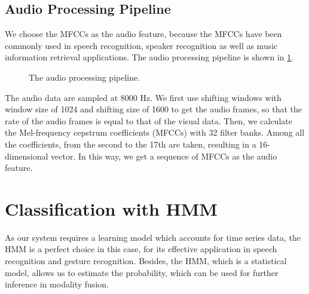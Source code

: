 \documentclass[12pt,final,twoside]{report}
\theoremstyle{plain}
\theoremstyle{definition}
\theoremstyle{remark}
\newcommand{\includetexfig}[1]{}
\begin{document}
\subsection{Audio Processing Pipeline}
We choose the MFCCs as the audio feature, because the MFCCs have been commonly used in speech recognition, speaker recognition as well as music information retrieval applications. The audio processing pipeline is shown in \cref{fig:apipe}.

\begin{figure}[t]
  \centering
  \includetexfig{apipe}
  \caption{The audio processing pipeline.}
  \label{fig:apipe}
\end{figure}

The audio data are sampled at 8000 Hz. We first use shifting windows with window size of 1024 and shifting size of 1600 to get the audio frames, so that the rate of the audio frames is equal to that of the visual data. Then, we calculate the Mel-frequency cepstrum coefficients (MFCCs) with 32 filter banks. Among all the coefficients, from the second to the 17th are taken, resulting in a 16-dimensional vector. In this way, we get a sequence of MFCCs as the audio feature.

\section{Classification with HMM}
As our system requires a learning model which accounts for time series data, the HMM is a perfect choice in this case, for its effective application in speech recognition and gesture recognition. Besides, the HMM, which is a statistical model, allows us to estimate the probability, which can be used for further inference in modality fusion.
\end{document}
